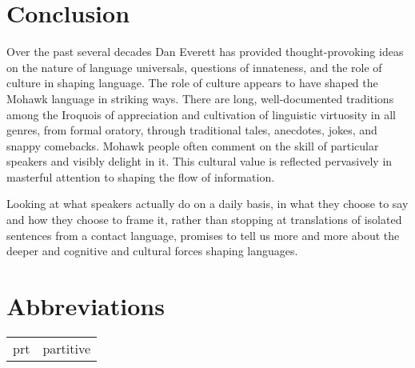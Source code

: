 \documentclass[output=paper,colorlinks,citecolor=brown]{langscibook}
\begin{document}
\section{Conclusion}

Over the past several decades Dan Everett has provided thought-provoking ideas on the nature of language universals, questions of innateness, and the role of culture in shaping language. The role of culture appears to have shaped the Mohawk language in striking ways. There are long, well-documented traditions among the Iroquois of appreciation and cultivation of linguistic virtuosity in all genres, from formal oratory, through traditional tales, anecdotes, jokes, and snappy comebacks. Mohawk people often comment on the skill of particular speakers and visibly delight in it. This cultural value is reflected pervasively in masterful attention to shaping the flow of information.

Looking at what speakers actually do on a daily basis, in what they choose to say and how they choose to frame it, rather than stopping at translations of isolated sentences from a contact language, promises to tell us more and more about the deeper and cognitive and cultural forces shaping languages.

\section*{Abbreviations}
\begin{tabularx}{.5\textwidth}{@{}lQ@{}}
prt & partitive \\
\end{tabularx}

\printbibliography[heading=subbibliography,notkeyword=this]
\end{document}
